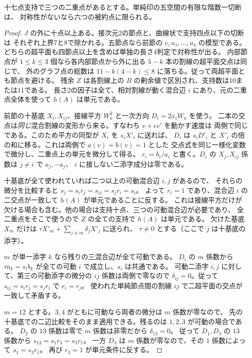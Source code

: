 \begin{lemma}\label{lem:confluent-three-first-jets}
十七点支持で三つの二重点があるとする。単純印の五空間の有限な階数一切断は、
対称性がないなら六つの被約点に限られる。
\end{lemma}
\begin{proof}
$J$ の外に十点以上ある。接次元2の節点と、曲線状で支持四点以下の切断は
それぞれ上界7と8で除かれる。五節点なら前節の $v,u_1,\ldots,u_4$ の模型である。
どちらの超平面も四節点以上を含めば単独の長さ4判定で対称性が出る。
内部節点が $1\le k\le3$ 個なら各内部節点から外に出る $5-k$ 本の割線の超平面交点は同じで、
外のグラフ点の総数は $11-k(4-k)\le8$ に落ちる。従って両超平面とも節点を避ける。
残余 $Z$ は各割線上の $B$ の剰余値で区別され、支持数は10または11である。
長さ2の因子は全て、相対割線が動く混合辺 $i$ にあり、元の二重点全体を使って $h(A)$ は単元である。

前節の十基底 $X_i,X_{ij}$、接線平方 $W_a^2$ と一次方向 $D_i=2x_i W_a$ を使う。
二本の交点は\emph{同じ}混合割線の変形から来る。すなわち $v+\epsilon v'$ を動かす速度は
両側で同じである。このため平方の同型が $X_i$ を $s_i X'_i$ に送れば、
$D_i$ は $s_iD'_i$ と $X'_i$ の倍の和に移る。これは両側で $a(v)=b(v)=1$ とした
交点式を同じ一様化変数で微分し、二重点上の単元を微分して得る。
$r_i=b_i/a_i$ と書く。$D_i$ の $X_j,X_{ij}$ 係数は $j\ne i$ で $a_j,-a_j$、
$i$ に接しない二添字成分は零である。

十基底が全て使われていれば二つ以上の可動混合辺 $i,j$ があるので、
それらの微分を比較すると $s_j=s_i r_j=s_{ij}=s_j r_i=s_i$。
よって $r_i=1$ であり、混合辺 $i$ の二交点が一致して $h(A)$ が単元であることに反する。
これは接線平方だけが欠ける場合も含む。他の場合は支持十点、三つの可動混合辺が必要であり、
全二重点をそこで使うので $Z$ の全ての支持で $h(A)$ は単元である。
欠けた基底 $X_m$ だけは $\tau X'_m+\sum_{j\ne m}\delta_j X'_j$ に送られ、
$\tau\ne0$ とする（ここで $j$ は十基底の添字）。

$m$ が単一添字 $k$ なら残りの三混合辺が全て可動である。
$D_i$ の $m$ 係数から $\tau a_k=s_i b_k$ が全ての可動 $i$ で成立し、$s_i$ は共通である。
可動二添字 $i,j$ に対して、第三の可動添字の微分の $ij$ 係数は両側で零なので
$\delta_{ij}=0$。従って $s_{ij}=s_i r_j=s_j r_i$ で $r_i=r_j$。
使われた単純節点間の割線 $ij$ で二超平面の交点が一致して矛盾する。

$m=12$ とする。$3,4$ がともに可動なら両者の微分は $m$ 係数が零なので、
先の十基底での二辺比較をそのまま適用できる。残るのは $1,2,3$ が可動の場合である。
$D_2$ の $13$ 係数は零で $m$ 係数は非零だから $\delta_{13}=0$。
従って $D_1,D_3$ の $13$ 係数から $s_{13}=s_1 r_3=s_3 r_1$。
一方 $D_3$ は $m$ 係数が零なので、その $1$ 係数によって $s_1=s_3 r_1$。
再び $r_3=1$ が単元条件に反する。
\end{proof}

